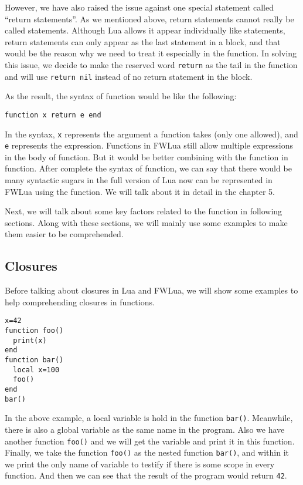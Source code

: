 However, we have also raised the issue against one special statement called ``return statements''. As we mentioned above, return statements cannot really be called statements. Although Lua allows it appear individually like statements, return statements can only appear as the last statement in a block, and that would be the reason why we need to treat it especially in the function. In solving this issue, we decide to make the reserved word {\tt return} as the tail in the function and will use {\tt return nil} instead of no return statement in the block.

As the result, the syntax of function would be like the following:
\begin{flushleft}
\tt function x {\tt return} e {\tt end}
\end{flushleft}
In the syntax, {\tt x} represents the argument a function takes (only one allowed), and {\tt e} represents the expression. Functions in FWLua still allow multiple expressions in the body of function. But it would be better combining with the function in function. After complete the syntax of function, we can say that there would be many syntactic sugars in the full version of Lua now can be represented in FWLua using the function. We will talk about it in detail in the chapter 5. 

Next, we will talk about some key factors related to the function in following sections. Along with these sections, we will mainly use some examples to make them easier to be comprehended.

\subsection{Closures}
Before talking about closures in Lua and FWLua, we will show some examples to help comprehending closures in functions.
\begin{flushleft}
{\tt x=42\\
function foo()\\
~~print(x)\\
end\\
function bar()\\
~~local x=100\\
~~foo()\\
end\\
bar()}
\end{flushleft}
In the above example, a local variable is hold in the function {\tt bar()}. Meanwhile, there is also a global variable as the same name in the program. Also we have another function {\tt foo()} and we will get the variable and print it in this function. Finally, we take the function {\tt foo()} as the nested function {\tt bar()}, and within it we print the only name of variable to testify if there is some scope in every function. And then we can see that the result of the program would return {\tt 42}.

